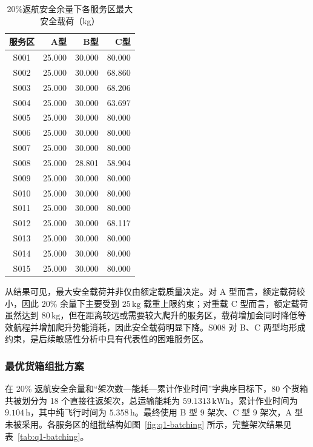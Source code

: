 \documentclass[bwprint,fontset=fandol]{gmcmthesis}
\begin{document}
\begin{table}[H]
  \centering
  \small
  \setlength{\tabcolsep}{5pt}
  \renewcommand{\arraystretch}{1.15}
  \caption{20\%返航安全余量下各服务区最大安全载荷（kg）}
  \label{tab:q1-safe-payload}
  \begin{tabular*}{0.75\linewidth}{@{\extracolsep{\fill}}crrr@{}}
    \toprule
    服务区 & A型 & B型 & C型 \\
    \midrule
    S001 & 25.000 & 30.000 & 80.000 \\
    S002 & 25.000 & 30.000 & 68.860 \\
    S003 & 25.000 & 30.000 & 68.206 \\
    S004 & 25.000 & 30.000 & 63.697 \\
    S005 & 25.000 & 30.000 & 80.000 \\
    S006 & 25.000 & 30.000 & 80.000 \\
    S007 & 25.000 & 30.000 & 80.000 \\
    S008 & 25.000 & 28.801 & 58.904 \\
    S009 & 25.000 & 30.000 & 80.000 \\
    S010 & 25.000 & 30.000 & 80.000 \\
    S011 & 25.000 & 30.000 & 80.000 \\
    S012 & 25.000 & 30.000 & 68.117 \\
    S013 & 25.000 & 30.000 & 80.000 \\
    S014 & 25.000 & 30.000 & 80.000 \\
    S015 & 25.000 & 30.000 & 80.000 \\
    \bottomrule
  \end{tabular*}
\end{table}

从结果可见，最大安全载荷并非仅由额定载质量决定。对 A 型而言，额定载荷较小，因此 20\% 余量下主要受到 $25\,\mathrm{kg}$ 载重上限约束；对重载 C 型而言，额定载荷虽然达到 $80\,\mathrm{kg}$，但在距离较远或需要较大爬升的服务区，载荷增加会同时降低等效航程并增加爬升势能消耗，因此安全载荷明显下降。S008 对 B、C 两型均形成约束，是后续敏感性分析中具有代表性的困难服务区。

\subsubsection{最优货箱组批方案}

在 20\% 返航安全余量和“架次数—能耗—累计作业时间”字典序目标下，80 个货箱共被划分为 18 个直接往返架次，总运输能耗为 $59.1313\,\mathrm{kWh}$，累计作业时间为 $9.104\,\mathrm{h}$，其中纯飞行时间为 $5.358\,\mathrm{h}$。最终使用 B 型 9 架次、C 型 9 架次，A 型未被采用。各服务区的组批结构如图~\ref{fig:q1-batching} 所示，完整架次结果见表~\ref{tab:q1-batching}。
\end{document}
